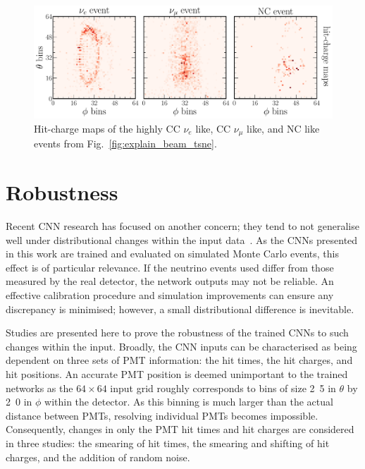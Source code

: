 \begin{figure} %
    \includegraphics[width=\textwidth]{diagrams/7-results/explain_beam_tsne_events.pdf}
    \caption[Hit-charge maps of highly CC $\nu_{e}$ like, CC $\nu_{\mu}$ like, and NC like events]
    {Hit-charge maps of the highly CC $\nu_{e}$ like, CC $\nu_{\mu}$ like, and NC like events from
        Fig.~\ref{fig:explain_beam_tsne}.}
    \label{fig:explain_beam_tsne_events}
\end{figure}

\section{Robustness} %
\label{sec:results_robust} %

Recent CNN research has focused on another concern; they tend to not generalise well under
distributional changes within the input data~\cite{djolonga2020}. As the CNNs presented in this
work are trained and evaluated on simulated Monte Carlo events, this effect is of particular
relevance. If the neutrino events used differ from those measured by the real \chipsfive detector,
the network outputs may not be reliable. An effective calibration procedure and simulation
improvements can ensure any discrepancy is minimised; however, a small distributional difference
is inevitable.

Studies are presented here to prove the robustness of the trained CNNs to such changes within the
input. Broadly, the CNN inputs can be characterised as being dependent on three sets of PMT
information: the hit times, the hit charges, and hit positions. An accurate PMT position is deemed
unimportant to the trained networks as the $64 \times 64$ input grid roughly corresponds to bins
of size \unit{2.5}{} in $\theta$ by \unit{2.0}{} in $\phi$ within the
\chipsfive detector. As this binning is much larger than the actual distance between PMTs,
resolving individual PMTs becomes impossible. Consequently, changes in only the PMT hit times and
hit charges are considered in three studies: the smearing of hit times, the smearing and shifting
of hit charges, and the addition of random noise.

